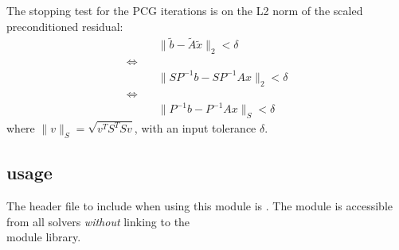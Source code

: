 The stopping test for the PCG iterations is on the L2 norm of the
scaled preconditioned residual:
\begin{align*}
  &\| \tilde{b} - \tilde{A} \tilde{x} \|_2  <  \delta\\
  \Leftrightarrow\quad &\\
  &\| S P^{-1} b - S P^{-1} A x \|_2  <  \delta\\
  \Leftrightarrow\quad &\\
  &\| P^{-1} b - P^{-1} A x \|_S  <  \delta
\end{align*}
where $\| v \|_S = \sqrt{v^T S^T S v}$, with an input tolerance $\delta$.


\subsection{{\sunlinsolpcg} usage}\label{ss:sunlinsol_pcg_usage}

The header file to include when using this module is
. The {\sunlinsolpcg} module
is accessible from all {\sundials} solvers \textit{without}
linking to the \\ \noindent
{} module library.


